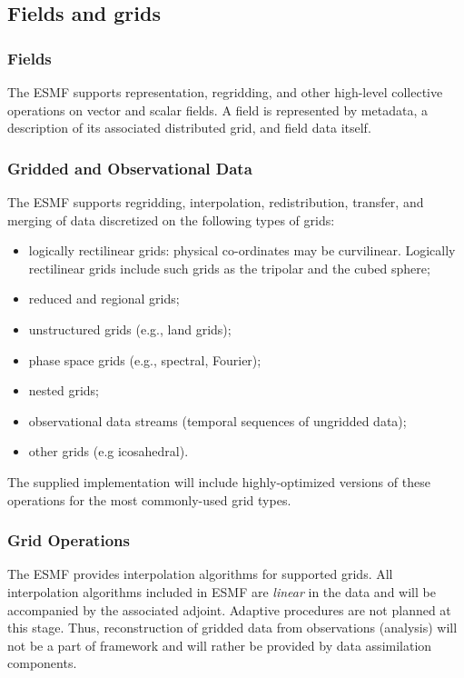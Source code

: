 \subsection{Fields and grids}

\subsubsection{Fields}
The ESMF supports representation, regridding, and other high-level
collective operations on vector and scalar fields.  A field is represented 
by metadata, a description of its associated distributed grid, and field 
data itself.

\subsubsection{Gridded and Observational Data}

The ESMF supports regridding, interpolation, redistribution,
transfer, and merging of data discretized on the following types of grids:

\begin{itemize}
\item logically rectilinear grids: physical co-ordinates may be
  curvilinear. Logically rectilinear grids include such grids as the
  tripolar and the cubed sphere;
\item reduced and regional grids;
\item unstructured grids (e.g., land grids);
\item phase space grids (e.g., spectral, Fourier);
\item nested grids;
\item observational data streams (temporal sequences of ungridded data);
\item other grids (e.g icosahedral).
\end{itemize}

The supplied implementation will include highly-optimized versions of
these operations for the most commonly-used grid types.

\subsubsection{Grid Operations}

The ESMF provides interpolation algorithms for supported grids.  All
interpolation algorithms included in ESMF are {\it linear} in the data
and will be accompanied by the associated adjoint.  Adaptive
procedures are not planned at this stage. Thus, reconstruction of
gridded data from observations (analysis) will not be a part of
framework and will rather be provided by data assimilation components.

